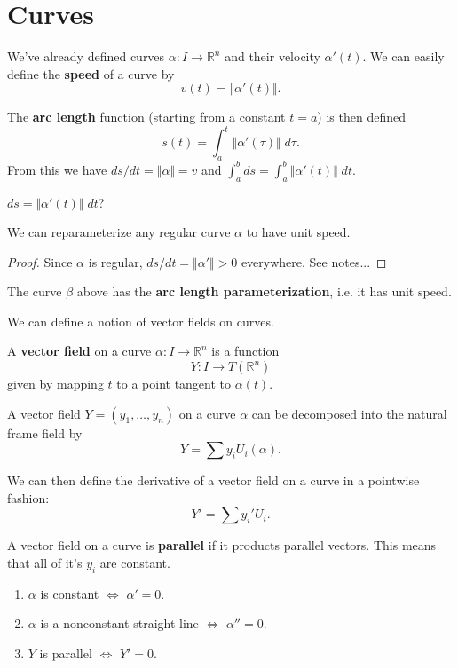 \documentclass[10pt]{report}
\begin{document}

\section{Curves}

We've already defined curves $\alpha:I \to \mathbb{R}^n$ and their velocity $\alpha'(t)$. We can easily define the \textbf{speed} of a curve by
\[
	v(t) = \Vert{\alpha'(t)}\Vert.
\] 

The \textbf{arc length} function (starting from a constant $t=a$) is then defined
\[
	s(t) = \int_{a}^{t} \Vert{\alpha'(\tau)}\Vert\;d\tau.
\] 
From this we have $ds/dt = \Vert{\alpha}\Vert=v$ and $\int_{a}^{b} ds = \int_{a}^{b} \Vert{\alpha'(t)}\Vert\;dt$.

{\color{red}$ds = \Vert{\alpha'(t)}\Vert\;dt$?}

\begin{thrm}[]
We can reparameterize any regular curve $\alpha$ to have unit speed.
\end{thrm}
\begin{proof}
	Since $\alpha$ is regular, $ds/dt = \Vert{\alpha'}\Vert>0$ everywhere. {\color{red}See notes...}
\end{proof}

The curve $\beta$ above has the \textbf{arc length parameterization}, i.e. it has unit speed.

We can define a notion of vector fields on curves.

\begin{defn}[]
	A \textbf{vector field} on a curve $\alpha:I\to \mathbb{R}^n$ is a function
	\[
		Y: I \to T(\mathbb{R}^n)
	\] given by mapping $t$ to a point tangent to $\alpha(t)$.
\end{defn}

A vector field $Y=(y_1, \dots, y_n)$ on a curve $\alpha$ can be decomposed into the natural frame field by
\[
	Y = \sum y_i U_i(\alpha).
\] 

We can then define the derivative of a vector field on a curve in a pointwise fashion:
\[
Y' = \sum y_i' U_i.
\] 

A vector field on a curve is \textbf{parallel} if it products parallel vectors. This means that all of it's $y_i$ are constant.

\begin{lem}
	\begin{enumerate}
		\item $\alpha$ is constant $\iff$ $\alpha'=0$.
		\item $\alpha$ is a nonconstant straight line $\iff$ $\alpha''=0$.
		\item $Y$ is parallel $\iff$ $Y'=0$.
	\end{enumerate}
\end{lem}
\end{document}

